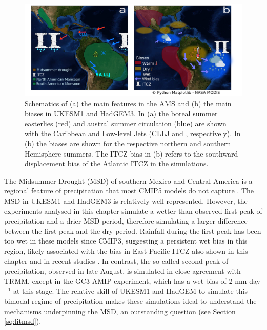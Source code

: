 \begin{figure}[t!]
\centering
 \includegraphics[width=\linewidth]{figures/drawing_e}
\caption[Summary schematic of biases in UKESM1 and HadGEM3]{Schematics of (a) the main features in the AMS and (b) the main biases in UKESM1 and HadGEM3. In (a) the boreal summer easterlies (red) and austral summer circulation (blue) are shown with the Caribbean and  Low-level Jets (CLLJ and , respectively). In (b) the biases are shown for the respective northern and southern Hemisphere summers. The ITCZ bias in (b) refers to the southward displacement bias of the Atlantic ITCZ in the simulations.  }
\label{fig:13}
\end{figure}

    The Midsummer Drought (MSD) of southern Mexico and Central America is a regional feature of precipitation that most CMIP5 models do not capture \citep{ryu2014}. 
The MSD in UKESM1 and HadGEM3 is relatively well represented. However, the experiments analysed in this chapter simulate a wetter-than-observed first peak of precipitation and a drier MSD period, therefore simulating a larger difference between the first peak and the dry period. %
Rainfall during the first peak has been too wet in these models since CMIP3, suggesting a persistent wet bias in this region, likely associated with the bias in East Pacific ITCZ also shown in this chapter and in recent studies \citep{ryu2014,mulcahy2018}. 
In contrast, the so-called second peak of precipitation, observed in late August, is simulated in close agreement with TRMM, except in the GC3 AMIP experiment, which has a wet bias of 2 mm day$^{-1}$ at this stage. The relative skill of UKESM1 and HadGEM to simulate this bimodal regime of precipitation makes these simulations ideal to understand the mechanisms underpinning the MSD, an outstanding question (see Section \ref{sq:litmsd}).  


